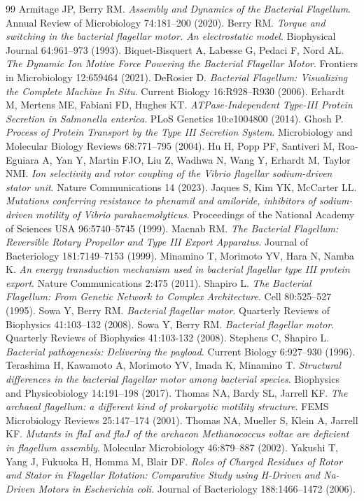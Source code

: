 \documentclass[11pt,letterpaper]{article}
\begin{document}
\begin{thebibliography}{99}
\small
{} Armitage JP, Berry RM. \emph{Assembly and Dynamics of the Bacterial Flagellum}. Annual Review of Microbiology 74:181–200 (2020).
 Berry RM. \emph{Torque and switching in the bacterial flagellar motor. An electrostatic model}. Biophysical Journal 64:961–973 (1993).
 Biquet-Bisquert A, Labesse G, Pedaci F, Nord AL. \emph{The Dynamic Ion Motive Force Powering the Bacterial Flagellar Motor}. Frontiers in Microbiology 12:659464 (2021).
 DeRosier D. \emph{Bacterial Flagellum: Visualizing the Complete Machine In Situ}. Current Biology 16:R928–R930 (2006).
 Erhardt M, Mertens ME, Fabiani FD, Hughes KT. \emph{ATPase-Independent Type-III Protein Secretion in Salmonella enterica}. PLoS Genetics 10:e1004800 (2014).
 Ghosh P. \emph{Process of Protein Transport by the Type III Secretion System}. Microbiology and Molecular Biology Reviews 68:771–795 (2004).
 Hu H, Popp PF, Santiveri M, Roa-Eguiara A, Yan Y, Martin FJO, Liu Z, Wadhwa N, Wang Y, Erhardt M, Taylor NMI. \emph{Ion selectivity and rotor coupling of the Vibrio flagellar sodium-driven stator unit}. Nature Communications 14 (2023).
 Jaques S, Kim YK, McCarter LL. \emph{Mutations conferring resistance to phenamil and amiloride, inhibitors of sodium-driven motility of Vibrio parahaemolyticus}. Proceedings of the National Academy of Sciences USA 96:5740–5745 (1999).
 Macnab RM. \emph{The Bacterial Flagellum: Reversible Rotary Propellor and Type III Export Apparatus}. Journal of Bacteriology 181:7149–7153 (1999).
 Minamino T, Morimoto YV, Hara N, Namba K. \emph{An energy transduction mechanism used in bacterial flagellar type III protein export}. Nature Communications 2:475 (2011).
 Shapiro L. \emph{The Bacterial Flagellum: From Genetic Network to Complex Architecture}. Cell 80:525–527 (1995).
 Sowa Y, Berry RM. \emph{Bacterial flagellar motor}. Quarterly Reviews of Biophysics 41:103–132 (2008).
 Sowa Y, Berry RM. \emph{Bacterial flagellar motor}. Quarterly Reviews of Biophysics 41:103-132 (2008).
 Stephens C, Shapiro L. \emph{Bacterial pathogenesis: Delivering the payload}. Current Biology 6:927–930 (1996).
 Terashima H, Kawamoto A, Morimoto YV, Imada K, Minamino T. \emph{Structural differences in the bacterial flagellar motor among bacterial species}. Biophysics and Physicobiology 14:191–198 (2017).
 Thomas NA, Bardy SL, Jarrell KF. \emph{The archaeal flagellum: a different kind of prokaryotic motility structure}. FEMS Microbiology Reviews 25:147–174 (2001).
 Thomas NA, Mueller S, Klein A, Jarrell KF. \emph{Mutants in flaI and flaJ of the archaeon Methanococcus voltae are deficient in flagellum assembly}. Molecular Microbiology 46:879–887 (2002).
 Yakushi T, Yang J, Fukuoka H, Homma M, Blair DF. \emph{Roles of Charged Residues of Rotor and Stator in Flagellar Rotation: Comparative Study using H-Driven and Na-Driven Motors in Escherichia coli}. Journal of Bacteriology 188:1466–1472 (2006).
\end{thebibliography}
\end{document}
